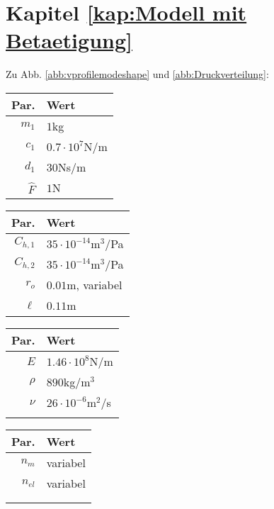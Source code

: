 \section{Kapitel \ref{kap:Modell mit Betaetigung}}
Zu Abb. \ref{abb:vprofilemodeshape} und \ref{abb:Druckverteilung}:
\begin{center}
\begin{tabular}{r|l}
Par. &Wert\\\hline
$m_1$&$1$kg\\
$c_{1}$&$0.7\cdot10^{7}$N/m\\
$d_{1}$&$30$Ns/m \\
$\hat{F}$&$1$N\\
\end{tabular}\hfill
\begin{tabular}{r|l}
Par. &Wert\\\hline
$C_{h,1}$&$35\cdot10^{-14}$m$^3$/Pa\\
$C_{h,2}$&$35\cdot10^{-14}$m$^3$/Pa\\
$r_o$&$0.01$m, variabel\\
$\ell$&$0.11$m\\
\end{tabular}\hfill
\begin{tabular}{r|l}
Par. &Wert\\\hline
$E$&$1.46\cdot10^{8}$N/m\\
$\rho$&$890$kg/m$^3$\\
$\nu$&$26\cdot10^{-6}$m$^2$/s\\
&
\end{tabular}\hfill
\begin{tabular}{r|l}
Par. &Wert\\\hline
$n_m$& variabel \\
$n_{el}$& variabel \\
&\\
&
\end{tabular} 
\end{center}

